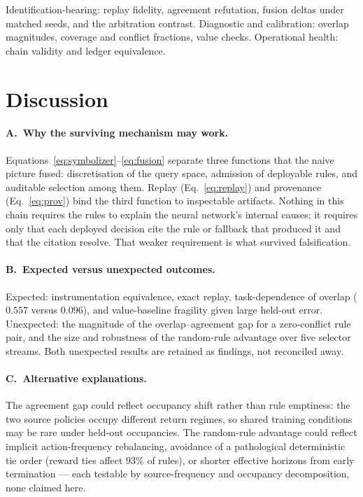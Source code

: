 \documentclass[11pt,a4paper]{article}
\theoremstyle{definition}
\begin{document}
Identification-bearing: replay fidelity, agreement refutation, fusion deltas
under matched seeds, and the arbitration contrast. Diagnostic and
calibration: overlap magnitudes, coverage and conflict fractions, value
checks. Operational health: chain validity and ledger equivalence.

\section{Discussion}

\paragraph{A.~Why the surviving mechanism may work.}
Equations~\eqref{eq:symbolizer}--\eqref{eq:fusion} separate three functions
that the naive picture fused: discretisation of the query space, admission
of deployable rules, and auditable selection among them. Replay
(Eq.~\eqref{eq:replay}) and provenance (Eq.~\eqref{eq:prov}) bind the third
function to inspectable artifacts. Nothing in this chain requires the rules
to explain the neural network's internal causes; it requires only that each
deployed decision cite the rule or fallback that produced it and that the
citation resolve. That weaker requirement is what survived falsification.

\paragraph{B.~Expected versus unexpected outcomes.}
Expected: instrumentation equivalence, exact replay, task-dependence of
overlap ($0.557$ versus $0.096$), and value-baseline fragility given large
held-out error. Unexpected: the magnitude of the overlap--agreement gap for a
zero-conflict rule pair, and the size and robustness of the random-rule
advantage over five selector streams. Both unexpected results are retained as
findings, not reconciled away.

\paragraph{C.~Alternative explanations.}
The agreement gap could reflect occupancy shift rather than rule emptiness:
the two source policies occupy different return regimes, so shared training
conditions may be rare under held-out occupancies. The random-rule advantage
could reflect implicit action-frequency rebalancing, avoidance of a
pathological deterministic tie order (reward ties affect $93\%$ of rules),
or shorter effective horizons from early termination --- each testable by
source-frequency and occupancy decomposition, none claimed here.
\end{document}
